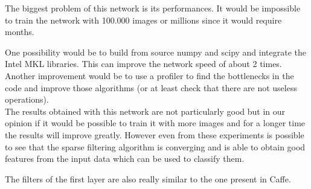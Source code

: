 The biggest problem of this network is its performances. It would be impossible to train the network with 100.000 images or millions since it would require months.

One possibility would be to build from source numpy and scipy and integrate the Intel MKL libraries. This can improve the network speed of about 2 times. Another improvement would be to use a profiler to find the bottlenecks in the code and improve those algorithms (or at least check that there are not useless operations). \\

The results obtained with this network are not particularly good but in our opinion if it would be possible to train it with more images and for a longer time the results will improve greatly. However even from these experiments is possible to see that the sparse filtering algorithm is converging and is able to obtain good features from the input data which can be used to classify them.

The filters of the first layer are also really similar to the one present in Caffe.


